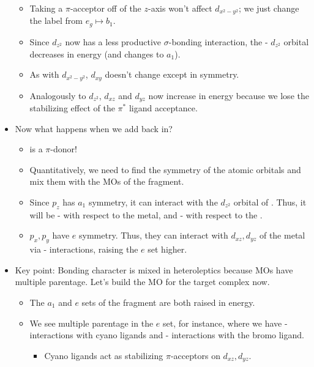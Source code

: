\documentclass[../notes.tex]{subfiles}
\begin{document}
\begin{itemize}
\begin{itemize}
\begin{table}[h!]
            \label{tab:dOrbOhC4v}
        \end{table}
        \item Taking a $\pi$-acceptor off of the $z$-axis won't affect $d_{x^2-y^2}$; we just change the label from $e_g\mapsto b_1$.
        \item Since $d_{z^2}$ now has a less productive $\sigma$-bonding interaction, the - $d_{z^2}$ orbital decreases in energy (and changes to $a_1$).
        \item As with $d_{x^2-y^2}$, $d_{xy}$ doesn't change except in symmetry.
        \item Analogously to $d_{z^2}$, $d_{xz}$ and $d_{yz}$ now increase in energy because we lose the stabilizing effect of the $\pi^*$ ligand acceptance.
    \end{itemize}
    \item Now what happens when we add  back in?
    \begin{itemize}
        \item {} is a $\pi$-donor!
        \item Quantitatively, we need to find the symmetry of the  atomic orbitals and mix them with the MOs of the fragment.
        \item Since $p_z$ has $a_1$ symmetry, it can interact with the $d_{z^2}$ orbital of . Thus, it will be - with respect to the metal, and - with respect to the .
        \item $p_x,p_y$ have $e$ symmetry. Thus, they can interact with $d_{xz},d_{yz}$ of the metal via - interactions, raising the $e$ set higher.
    \end{itemize}
    \item Key point: Bonding character is mixed in heteroleptics because MOs have multiple parentage. Let's build the MO for the target complex now.
    \begin{itemize}
        \item The $a_1$ and $e$ sets of the  fragment are both raised in energy.
        \item We see multiple parentage in the $e$ set, for instance, where we have - interactions with cyano ligands and - interactions with the bromo ligand.
        \begin{itemize}
            \item Cyano ligands act as stabilizing $\pi$-acceptors on $d_{xz},d_{yz}$.

\end{itemize}
\end{itemize}
\end{itemize}
\end{document}
